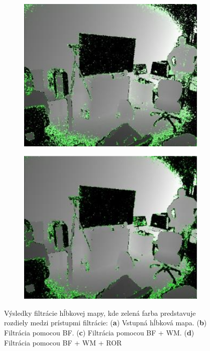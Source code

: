 \begin{figure}[H]
	\hfill
	\begin{subfigure}[b]{0.24\textwidth}
		\centering
		\includegraphics[width=\textwidth]{figures/resers_p.png}
		\caption{}
		\label{fig:resers:p}
	\end{subfigure}
	\hfill
	\begin{subfigure}[b]{0.24\textwidth}
		\centering
		\includegraphics[width=\textwidth]{figures/resers_q.png}
		\caption{}
		\label{fig:resers:q}
	\end{subfigure}
	\caption{Výsledky filtrácie hĺbkovej mapy, kde zelená farba predstavuje rozdiely medzi prístupmi filtrácie: (\textbf{a}) Vstupná hĺbková mapa. 
		(\textbf{b}) Filtrácia pomocou BF.
		(\textbf{c}) Filtrácia pomocou BF + WM.
		(\textbf{d}) Filtrácia pomocou BF + WM + ROR }
	\label{fig:resers:5}
\end{figure}


